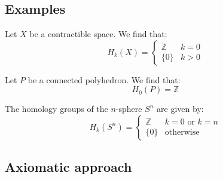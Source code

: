\subsection{Examples}

	\begin{example}
		Let $X$ be a contractible space. We find that:
		\begin{equation}
			H_k(X) = \begin{cases}
				\mathbb{Z}&k=0\\
				\{0\}&k>0
			\end{cases}
		\end{equation}
	\end{example}
	\begin{example}
		Let $P$ be a connected polyhedron. We find that:
		\begin{equation}
			H_0(P) = \mathbb{Z}
		\end{equation}
	\end{example}
	\begin{example}
		The homology groups of the $n$-sphere $S^n$ are given by:
		\begin{equation}
			H_k(S^n)=\begin{cases}
				\mathbb{Z}&k=0\text{ or }k=n\\
				\{0\}&\text{otherwise}
			\end{cases}
		\end{equation}
	\end{example}

\subsection{Axiomatic approach}

